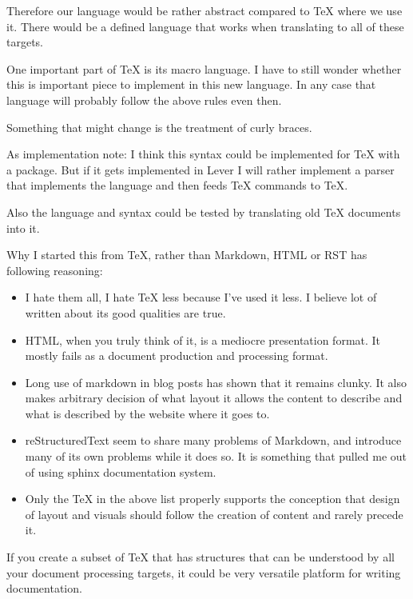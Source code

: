 \documentclass{article}
\begin{document}
Therefore our language would be rather abstract compared to
TeX where we use it. There would be a defined language that
works when translating to all of these targets.

One important part of TeX is its macro language. I have to
still wonder whether this is important piece to implement in
this new language. In any case that language will probably
follow the above rules even then.

Something that might change is the treatment of curly braces.

As implementation note:
I think this syntax could be implemented for TeX with a
package. But if it gets implemented in Lever I will rather
implement a parser that implements the language and then
feeds TeX commands to TeX.

Also the language and syntax could be tested by translating
old TeX documents into it.

Why I started this from TeX, rather than Markdown, HTML or
RST has following reasoning:

\begin{itemize}
    \item
        I hate them all, I hate TeX less because I've used
        it less. I believe lot of written about its good
        qualities are true.
    \item
        HTML, when you truly think of it, is a mediocre
        presentation format. It mostly fails as a
        document production and processing format.
    \item
        Long use of markdown in blog posts has shown that it
        remains clunky. It also makes arbitrary decision of
        what layout it allows the content to describe and
        what is described by the website where it goes to.
    \item
        reStructuredText seem to share many problems of
        Markdown, and introduce many of its own problems
        while it does so. It is something that pulled me out
        of using sphinx documentation system.
    \item
        Only the TeX in the above list properly supports the
        conception that design of layout and visuals should
        follow the creation of content and rarely precede it.
\end{itemize}

If you create a subset of TeX that has structures that can
be understood by all your document processing targets, it
could be very versatile platform for writing documentation.
\end{document}
